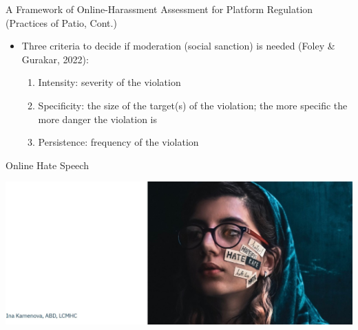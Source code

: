 \documentclass[nobackground,dvipsnames,table]{beamer}
\begin{document}
\begin{frame}{A Framework of Online-Harassment Assessment for Platform Regulation (Practices of Patio, Cont.)}

\begin{itemize}
    \item Three criteria to decide if moderation (social sanction) is needed (Foley \& Gurakar, 2022):
    \begin{enumerate}
        \item Intensity: severity of the violation
        \item Specificity: the size of the target(s) of the violation; the more specific the more danger the violation is
        \item Persistence: frequency of the violation 
    \end{enumerate}
\end{itemize}
\end{frame}



\begin{frame}{Online Hate Speech}

\includegraphics[scale=.28]{img/fig2.jpg}

\end{frame}
\end{document}
